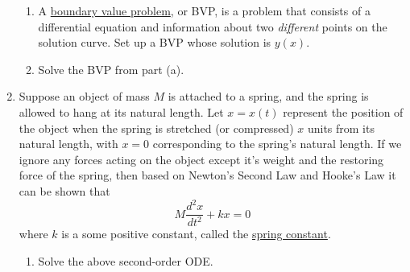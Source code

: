 \documentclass[12pt]{article}
\newif\ifans
\begin{document}
\begin{enumerate}
\begin{enumerate}
\item A \underline{boundary value problem}, or BVP, is a problem that consists of a differential equation and information about two \emph{different} points on the solution curve.   \newline
Set up a BVP whose solution is $y(x)$.

\ifans{\fbox{$\left\{\begin{array}{l}
 25y=10\frac{dy}{dx}-\frac{d^2y}{dx^2}
\\ \\
y(0)=0
\\ \\
y(\ln{2})=64
\end{array}\right.$; Detailed Solution: \textcolor{blue}{\href{http://www.math.drexel.edu/classes/Calculus/resources/Math123HW/Solutions/123_04_Second_Order_ODEs_14.pdf}{Here}}}} \fi

\item Solve the BVP from part (a).

\ifans{\fbox{$y=\frac{2}{\ln{2}}xe^{5x}$}} \fi

\end{enumerate}

\item Suppose an object of mass $M$ is attached to a spring, and the spring is allowed to hang at its natural length.  Let $x=x(t)$ represent the position of the object when the spring is stretched (or compressed)
$x$ units from its natural length, with $x=0$ corresponding to the spring's natural length.  If we ignore any forces acting on the object except it's weight and the restoring force of the spring, then based on Newton's
Second Law and Hooke's Law it can be shown that $$M\frac{d^2x}{dt^2}+kx=0$$ where $k$ is a some positive constant, called the \underline{spring constant}.

\begin{enumerate}

\item Solve the above second-order ODE.

\ifans{\fbox{$x(t)=c_1\cos{\left(\sqrt{\frac{k}{M}}t\right)}+c_2\sin{\left(\sqrt{\frac{k}{M}}t\right)}$; Detailed Solution: \textcolor{blue}{\href{http://www.math.drexel.edu/classes/Calculus/resources/Math123HW/Solutions/123_04_Second_Order_ODEs_15.pdf}{Here}}}} \fi


\end{enumerate}
\end{enumerate}
\end{document}
